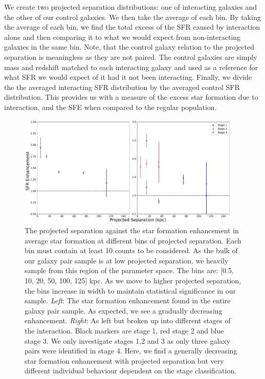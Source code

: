 We create two projected separation distributions: one of interacting galaxies and the other of our control galaxies. We then take the average of each bin. By taking the average of each bin, we find the total excess of the SFR caused by interaction alone and then comparing it to what we would expect from non-interacting galaxies in the same bin. Note, that the control galaxy relation to the projected separation is meaningless as they are not paired. The control galaxies are simply mass and redshift matched to each interacting galaxy and used as a reference for what SFR we would expect of it had it not been interacting. Finally, we divide the the averaged interacting SFR distribution by the averaged control SFR distribution. This provides us with a measure of the excess star formation due to interaction, and the SFE when compared to the regular population.

\begin{figure}
    \centering
    \includegraphics[width=0.95\textwidth]{Chapter3/figures/sfr-enhancement-projected-sep.pdf}
    \caption{The projected separation against the star formation enhancement in average star formation at different bins of projected separation. Each bin must contain at least 10 counts to be considered. As the bulk of our galaxy pair sample is at low projected separation, we heavily sample from this region of the parameter space. The bins are: [0.5, 10, 20, 50, 100, 125] kpc. As we move to higher projected separation, the bins increase in width to maintain statistical significance in our sample. \textit{Left}: The star formation enhancement found in the entire galaxy pair sample. As expected, we see a gradually decreasing enhancement. \textit{Right}: As left but broken up into different stages of the interaction. Black markers are stage 1, red stage 2 and blue stage 3. We only investigate stages 1,2 and 3 as only three galaxy pairs were identified in stage 4. Here, we find a generally decreasing star formation enhancement with projected separation but very different individual behaviour dependent on the stage classification.}
    \label{fig:sfr-enhancement-sep}
\end{figure}

